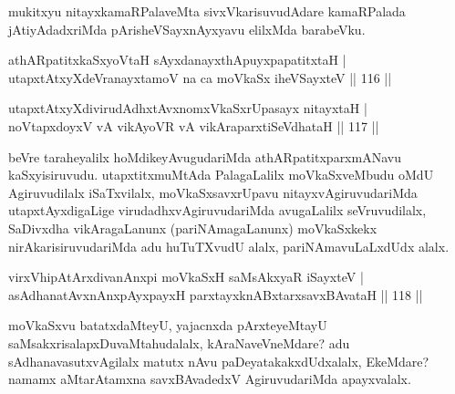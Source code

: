 \begin{artha}
mukitxyu nitayxkamaRPalaveMta sivxVkarisuvudAdare kamaRPalada jAtiyAdadxriMda pArisheVSayxnAyxyavu elilxMda barabeVku.
\end{artha}

\begin{shl}
athARpatitxkaSxyoV\s taH sAyxdanayxthA\s puyxpapatitxtaH |\\
utapxtAtxyXdeVranayxtamoV na ca moVkaSx iheVSayxteV \hfill || 116 ||
\end{shl}

\begin{shl}
utapxtAtxyXdivirudAdhxtAvxnomxVkaSxrUpasayx nitayxtaH |\\
noVtapxdoyxV vA vikAyoVR vA vikAraparxtiSeVdhataH \hfill || 117 ||
\end{shl}

\begin{artha}
beVre taraheyalilx hoMdikeyAvugudariMda athARpatitxparxmANavu kaSxyisiruvudu. utapxtitxmuMtAda PalagaLalilx moVkaSxveMbudu oMdU Agiruvudilalx iSaTxvilalx, moVkaSxsavxrUpavu nitayxvAgiruvudariMda utapxtAyxdigaLige virudadhxvAgiruvudariMda avugaLalilx seVruvudilalx, SaDivxdha vikAragaLanunx (pariNAmagaLanunx) moVkaSxkekx nirAkarisiruvudariMda adu huTuTXvudU alalx, pariNAmavuLaLxdUdx alalx.
\end{artha}

\begin{shl}
\footnotemark{}virxVhipAtArxdivanAnxpi moVkaSxH saMsAkxyaR iSayxteV |\\
asAdhanatAvxnAnxpAyxpayxH parxtayxknABxtarxsavxBAvataH \hfill || 118 ||
\end{shl}

\begin{artha}
moVkaSxvu batatxdaMteyU, yajacnxda pArxteyeMtayU saMsakxrisalapxDuvaMtahudalalx, kAraNaveVneMdare? adu sAdhanavasutxvAgilalx matutx nAvu paDeyatakakxdUdxalalx, EkeMdare? namamx aMtarAtamxna savxBAvadedxV AgiruvudariMda apayxvalalx.
\end{artha}


